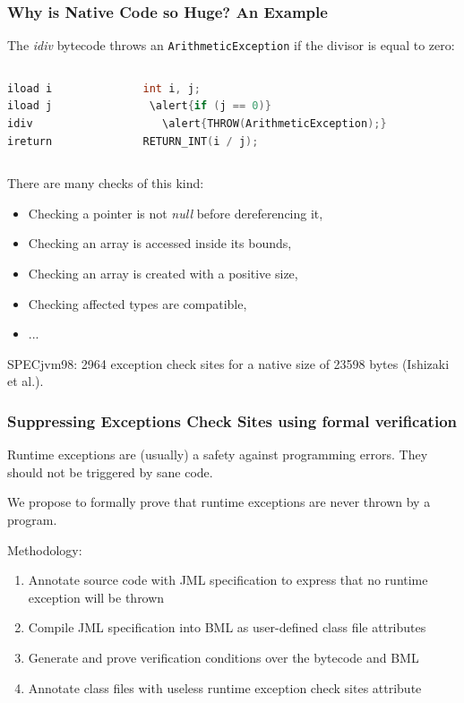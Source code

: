 \documentclass{beamer}
\begin{document}
\begin{frame}[fragile]\frametitle{Why is Native Code so Huge? An Example}
The \emph{idiv} bytecode throws an \texttt{ArithmeticException} if the divisor is equal to zero:

\begin{columns}
\begin{column}{5.1cm}
\begin{lstlisting}[language=jvmis]
iload i
iload j
idiv
ireturn
\end{lstlisting}
\end{column}
\begin{column}{5.1cm}
\begin{lstlisting}[language=C]
int i, j;
 \alert{if (j == 0)}
   \alert{THROW(ArithmeticException);}
RETURN_INT(i / j);
\end{lstlisting}
\end{column}
\end{columns}
\bigskip
There are many checks of this kind:
\begin{itemize}
\item Checking a pointer is not \emph{null} before dereferencing it,
\item Checking an array is accessed inside its bounds,
\item Checking an array is created with a positive size,
\item Checking affected types are compatible,
\item ...
\end{itemize}
SPECjvm98: 2964 exception check sites for a native size of 23598 bytes (Ishizaki et al.).
\end{frame}


\begin{frame}\frametitle{Suppressing Exceptions Check Sites using formal verification}

Runtime exceptions are (usually) a safety against programming errors. They should not be triggered by sane code.

We propose to formally prove that runtime exceptions are never thrown by a program.

Methodology:
\begin{enumerate}
\item Annotate source code with JML specification to express that no runtime exception will be thrown
\item Compile JML specification into BML as user-defined class file attributes
\item Generate and prove verification conditions over the bytecode and BML
\item Annotate class files with useless runtime exception check sites attribute
\end{enumerate}
\end{frame}
\end{document}
